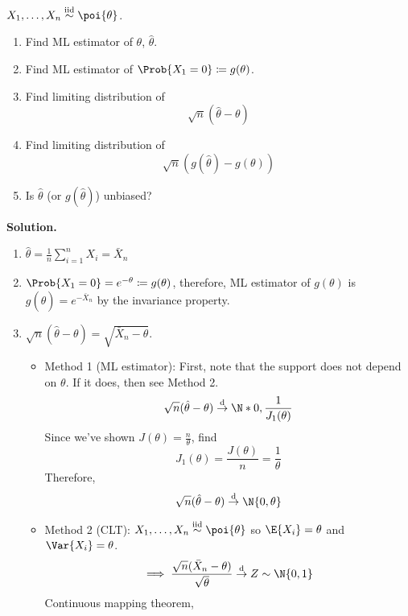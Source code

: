 \begin{Example}{}{}
    $ X_1,\ldots,X_n \stackrel{\text{iid}}{\sim}\poi{\theta} $.
    \begin{enumerate}[label=(\roman*)]
        \item Find ML estimator of $ \theta $, $ \hat{\theta} $.
        \item Find ML estimator of $ \Prob{X_1=0}\coloneq g(\theta) $.
        \item Find limiting distribution of
              \[ \sqrt{n}(\hat{\theta}-\theta) \]
        \item Find limiting distribution of
              \[ \sqrt{n}(g(\hat{\theta})-g(\theta)) \]
        \item Is $ \hat{\theta} $ (or $ g(\hat{\theta}) $) unbiased?
    \end{enumerate}
    \textbf{Solution.}
    \begin{enumerate}[label=(\roman*)]
        \item $ \displaystyle \hat{\theta}=\frac{1}{n}\sum_{i=1}^{n} X_i=\bar{X}_n $
        \item $ \Prob{X_1=0}=e^{-\theta}\coloneq g(\theta) $,
              therefore, ML estimator of $ g(\theta) $ is $ g(\hat{\theta})=e^{-\bar{X}_n} $
              by the invariance property.
        \item $ \sqrt{n}(\hat{\theta}-\theta)=\sqrt{\bar{X}_n-\theta} $.
              \begin{itemize}
                  \item Method 1 (ML estimator): First, note that
                        the support does not depend on $ \theta $. If it does,
                        then see Method 2.
                        \[ \sqrt{n}(\hat{\theta}-\theta)\stackrel{\text{d}}{\to}
                            \N*{0,\frac{1}{J_1(\theta)} } \]
                        Since we've shown $ J(\theta)=\frac{n}{\theta} $, find
                        \[ J_1(\theta)=\frac{J(\theta)}{n}=\frac{1}{\theta} \]
                        Therefore,
                        \[  \sqrt{n}(\hat{\theta}-\theta)\stackrel{\text{d}}{\to}
                            \N{0,\theta} \]
                  \item Method 2 (CLT): $ X_1,\ldots,X_n\stackrel{\text{iid}}{\sim}\poi{\theta} $
                        so $ \E{X_i}=\theta $ and $ \Var{X_i}=\theta $.
                        \[ \implies \frac{\sqrt{n}(\bar{X}_n-\theta)}{\sqrt{\theta}}
                            \stackrel{\text{d}}{\to}Z \sim \N{0,1}  \]
                        Continuous mapping theorem,

\end{itemize}
\end{enumerate}
\end{Example}

